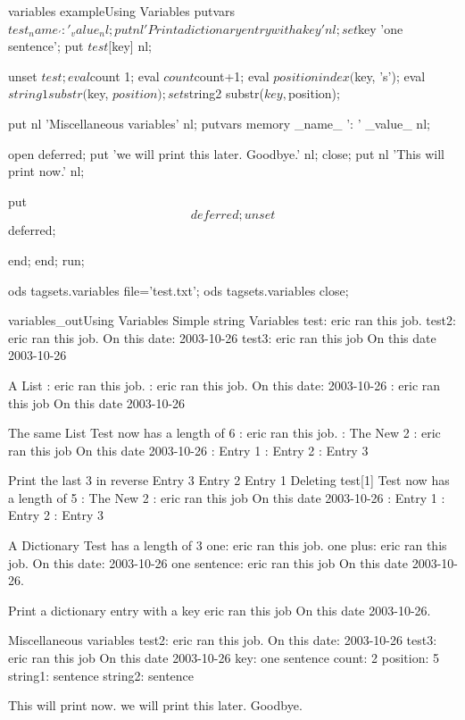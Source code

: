 \begin{fvcode}{variables example}{Using Variables}
            putvars $test _name_ ': ' _value_ nl;

            put nl 'Print a dictionary entry with a key' nl;
            set $key 'one sentence';
            put $test[$key] nl;

            unset $test;

            eval $count 1;
            eval $count $count+1;
            eval $position index($key, 's');
            eval $string1 substr($key, $position);
            set $string2 substr($key, $position);

            put nl 'Miscellaneous variables' nl;
            putvars memory _name_ ': ' _value_ nl;

            open deferred;
                put 'we will print this later.  Goodbye.' nl;
            close;
            put nl 'This will print now.' nl;
   
            put $$deferred;
   
            unset $$deferred;

        end;
    end;
run;

ods tagsets.variables file='test.txt';
ods tagsets.variables close;
\end{fvcode}

\begin{poutput}{variables_out}{Using Variables}
Simple string Variables
test: eric ran this job.
test2: eric ran this job. On this date: 2003-10-26
test3: eric ran this job On this date 2003-10-26

A List
: eric ran this job.
: eric ran this job. On this date: 2003-10-26
: eric ran this job On this date 2003-10-26

The same List
Test now has a length of 6
: eric ran this job.
: The New 2
: eric ran this job On this date 2003-10-26
: Entry 1
: Entry 2
: Entry 3

Print the last 3 in reverse
Entry 3
Entry 2
Entry 1
Deleting test[1]
Test now has a length of 5
: The New 2
: eric ran this job On this date 2003-10-26
: Entry 1
: Entry 2
: Entry 3

A Dictionary
Test has a length of 3
one: eric ran this job.
one plus: eric ran this job. On this date: 2003-10-26
one sentence: eric ran this job On this date 2003-10-26.

Print a dictionary entry with a key
eric ran this job On this date 2003-10-26.

Miscellaneous variables
test2: eric ran this job. On this date: 2003-10-26
test3: eric ran this job On this date 2003-10-26
key: one sentence
count: 2
position: 5
string1: sentence
string2: sentence

This will print now.
we will print this later.  Goodbye.
\end{poutput}

